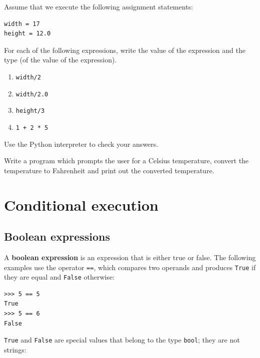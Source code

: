 \documentclass[10pt]{book}
\begin{document}
\begin{ex}
Assume that we execute the following assignment statements:

\begin{verbatim}
width = 17
height = 12.0
\end{verbatim}

For each of the following expressions, write the value of the
expression and the type (of the value of the expression).

\begin{enumerate}

\item {\tt width/2}

\item {\tt width/2.0}

\item {\tt height/3}

\item {\tt 1 + 2 * 5}

\end{enumerate}

Use the Python interpreter to check your answers.
\end{ex}

\begin{ex}
Write a program which prompts the user for a Celsius temperature,
convert the temperature to Fahrenheit and print out the converted
temperature.
\end{ex}


\chapter{Conditional execution}

\section{Boolean expressions}

A {\bf boolean expression} is an expression that is either true
or false.  The following examples use the 
operator {\tt ==}, which compares two operands and produces
{\tt True} if they are equal and {\tt False} otherwise:

\beforeverb
\begin{verbatim}
>>> 5 == 5
True
>>> 5 == 6
False
\end{verbatim}
\afterverb
%
{\tt True} and {\tt False} are special
values that belong to the type {\tt bool}; they are not strings:
\end{document}
